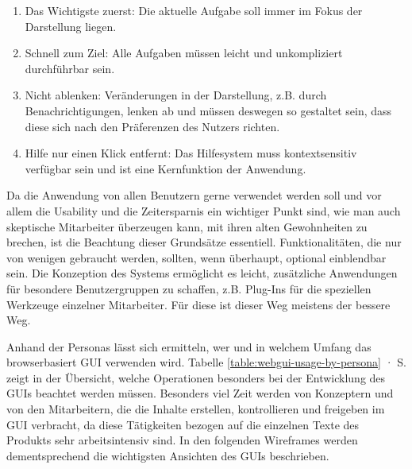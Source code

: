 \begin{enumerate}\itemsep -5pt
\item Das Wichtigste zuerst: Die aktuelle Aufgabe soll immer im Fokus der Darstellung liegen.
\item Schnell zum Ziel: Alle Aufgaben müssen leicht und unkompliziert durchführbar sein. 
\item Nicht ablenken: Veränderungen in der Darstellung, z.B. durch Benachrichtigungen, lenken ab und müssen deswegen so gestaltet sein, dass diese sich nach den Präferenzen des Nutzers richten.
\item Hilfe nur einen Klick entfernt: Das Hilfesystem muss kontextsensitiv verfügbar sein und ist eine Kernfunktion der Anwendung.
\end{enumerate}

Da die Anwendung von allen Benutzern gerne verwendet werden soll und vor allem die Usability und die Zeitersparnis ein wichtiger Punkt sind, wie man auch skeptische Mitarbeiter überzeugen kann, mit ihren alten Gewohnheiten zu brechen, ist die Beachtung dieser Grundsätze essentiell. Funktionalitäten, die nur von wenigen gebraucht werden, sollten, wenn überhaupt, optional einblendbar sein. Die Konzeption des Systems ermöglicht es leicht, zusätzliche Anwendungen für besondere Benutzergruppen zu schaffen, z.B. Plug-Ins für die speziellen Werkzeuge einzelner Mitarbeiter. Für diese  ist dieser Weg meistens der bessere Weg.

Anhand der Personas lässt sich ermitteln, wer und in welchem Umfang das browserbasiert GUI verwenden wird. Tabelle \ref{table:webgui-usage-by-persona} · S.\pageref{table:webgui-usage-by-persona} zeigt in der Übersicht, welche Operationen besonders bei der Entwicklung des GUIs beachtet werden müssen. Besonders viel Zeit werden von Konzeptern und von den Mitarbeitern, die die Inhalte erstellen, kontrollieren und freigeben im GUI verbracht, da diese Tätigkeiten bezogen auf die einzelnen Texte des Produkts sehr arbeitsintensiv sind. In den folgenden Wireframes werden dementsprechend die wichtigsten Ansichten des GUIs beschrieben.

